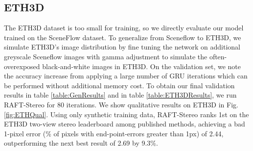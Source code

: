 \documentclass[10pt,twocolumn,letterpaper]{article}
\begin{document}
\subsection{ETH3D}
\setlength\tabcolsep{.4em}
\begin{table}[bp]
\centering
{}
\vspace{1mm}
\caption{Results on the ETH3D test set leaderboard. At the time of submission, RAFT-Stereo ranks first across every evaluation metric among all published methods. For all metrics, lower is better.}
\label{table:ETH3DResults}
\end{table}

 The ETH3D dataset is too small for training, so we directly evaluate our model trained on the SceneFlow dataset. To generalize from Sceneflow to ETH3D, we simulate ETH3D's image distribution by fine tuning the network on additional greyscale Sceneflow images with gamma adjustment to simulate the often-overexposed black-and-white images in ETH3D.  On the validation set, we note the accuracy increase from applying a large number of GRU iterations which can be performed without additional memory cost. To obtain our final validation results in table \ref{table:GenResults} and in table \ref{table:ETH3DResults}, we run RAFT-Stereo for 80 iterations. We show qualitative results on ETH3D in Fig. \ref{fig:ETHQual}. Using only synthetic training data, RAFT-Stereo ranks 1st on the ETH3D two-view stereo leaderboard\cite{eth3d} among published methods, achieving a bad 1-pixel error (\% of pixels with end-point-errors greater than 1px) of 2.44, outperforming the next best result of 2.69 by 9.3\%. 
\end{document}
